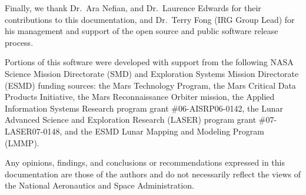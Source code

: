 Finally, we thank Dr.~Ara Nefian, and Dr.~Laurence Edwards for their
contributions to this documentation, and Dr.~Terry Fong (IRG Group
Lead) for his management and support of the open source and public
software release process.

Portions of this software were developed with support from the
following NASA Science Mission Directorate (SMD) and Exploration
Systems Mission Directorate (ESMD) funding sources: the Mars
Technology Program, the Mars Critical Data Products Initiative, the
Mars Reconnaissance Orbiter mission, the Applied Information Systems
Research program grant \#06-AISRP06-0142, the Lunar Advanced Science
and Exploration Research (LASER) program grant \#07-LASER07-0148,
and the ESMD Lunar Mapping and Modeling Program (LMMP).

Any opinions, findings, and conclusions or recommendations expressed
in this documentation are those of the authors and do not necessarily
reflect the views of the National Aeronautics and Space Administration.
